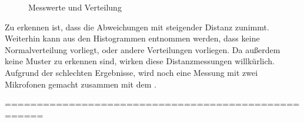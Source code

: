\begin{figure}[H]
	\hspace*{-3.5cm}
	\caption{Messwerte und Verteilung}
	\label{img:figure_400cm}
\end{figure}

Zu erkennen ist, dass die Abweichungen mit steigender Distanz zunimmt. Weiterhin kann aus den Histogrammen entnommen werden, dass keine Normalverteilung vorliegt, oder andere Verteilungen vorliegen. Da außerdem keine Muster zu erkennen sind, wirken diese Distanzmessungen willkürlich. Aufgrund der schlechten Ergebnisse, wird noch eine Messung mit zwei Mikrofonen gemacht zusammen mit dem \board .

====================================================


